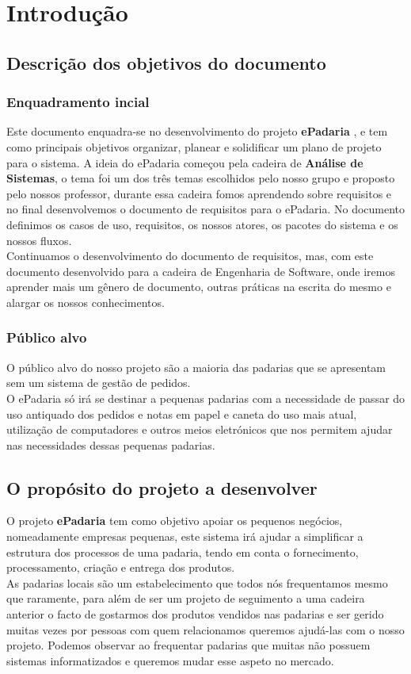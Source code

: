 \chapter{Introdução}
\label{introdução}
\section{Descrição dos objetivos do documento}
\subsection{Enquadramento incial}
Este documento enquadra-se no desenvolvimento do projeto \textbf{ePadaria} , e tem como principais objetivos organizar, planear e solidificar um plano de projeto para o sistema.
A ideia do ePadaria começou pela cadeira de \textbf{Análise de Sistemas}, o tema foi um dos três temas escolhidos pelo nosso grupo e proposto pelo nossos professor, durante essa cadeira fomos aprendendo sobre requisitos e no final desenvolvemos o documento de requisitos para o ePadaria. No documento definimos os casos de uso, requisitos, os nossos atores, os pacotes do sistema e os nossos fluxos.\\
Continuamos o desenvolvimento do documento de requisitos, mas, com este documento desenvolvido para a cadeira de Engenharia de Software, onde iremos aprender mais um gênero de documento, outras práticas na escrita do mesmo e alargar os nossos conhecimentos.


\subsection{Público alvo}
O público alvo do nosso projeto são a maioria das padarias que se apresentam sem um sistema de gestão de pedidos.\\
O ePadaria só irá se destinar a pequenas padarias com a necessidade de passar do uso antiquado dos pedidos e notas em papel e caneta do uso mais atual, utilização de computadores e outros meios eletrónicos que nos permitem ajudar nas necessidades dessas pequenas padarias.

\section{O propósito do projeto a desenvolver}
O projeto \textbf{ePadaria} tem como objetivo apoiar os pequenos negócios, nomeadamente empresas pequenas, este sistema irá ajudar a simplificar a estrutura dos processos de uma padaria, tendo em conta o fornecimento, processamento, criação e entrega dos produtos.\\
As padarias locais são um estabelecimento que todos nós frequentamos mesmo que raramente, para além de ser um projeto de seguimento a uma cadeira anterior o facto de gostarmos dos produtos vendidos nas padarias e ser gerido muitas vezes por pessoas com quem relacionamos queremos ajudá-las com o nosso projeto. Podemos observar ao frequentar padarias que muitas não possuem sistemas informatizados e queremos mudar esse aspeto no mercado.
\\
